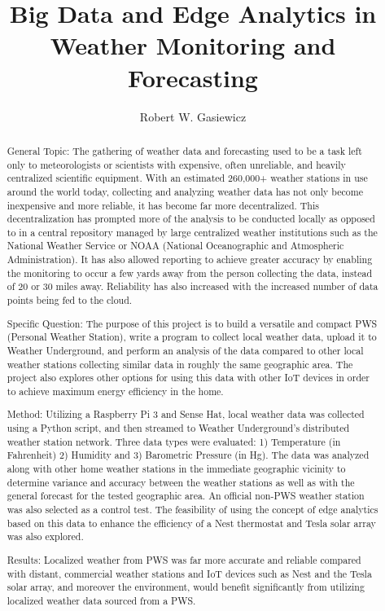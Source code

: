 \documentclass[sigconf]{acmart}
\begin{document}
\title{Big Data and Edge Analytics in Weather Monitoring and Forecasting}


\author{Robert W. Gasiewicz}

\begin{abstract}
General Topic: The gathering of weather data and forecasting used to be a task left only to meteorologists or scientists with expensive, often unreliable, and heavily centralized scientific equipment. With an estimated 260,000+ weather stations in use around the world today\cite{WundergroundOverview2017}, collecting and analyzing weather data has not only become inexpensive and more reliable, it has become far more decentralized. This decentralization has prompted more of the analysis to be conducted locally as opposed to in a central repository managed by large centralized weather institutions such as the National Weather Service or NOAA (National Oceanographic and Atmospheric Administration). It has also allowed reporting to achieve greater accuracy by enabling the monitoring to occur a few yards away from the person collecting the data, instead of 20 or 30 miles away. Reliability has also increased with the increased number of data points being fed to the cloud.

Specific Question: The purpose of this project is to build a versatile and compact PWS (Personal Weather Station), write a program to collect local weather data, upload it to Weather Underground, and perform an analysis of the data compared to other local weather stations collecting similar data in roughly the same geographic area. The project also explores other options for using this data with other IoT devices in order to achieve maximum energy efficiency in the home.

Method: Utilizing a Raspberry Pi 3 and Sense Hat, local weather data was collected using a Python script, and then streamed to Weather Underground's distributed weather station network. Three data types were evaluated: 1) Temperature (in Fahrenheit) 2) Humidity and 3) Barometric Pressure (in Hg). The data was analyzed along with other home weather stations in the immediate geographic vicinity to determine variance and accuracy between the weather stations as well as with the general forecast for the tested geographic area. An official non-PWS weather station was also selected as a control test. The feasibility of using the concept of edge analytics based on this data to enhance the efficiency of a Nest thermostat and Tesla solar array was also explored. 

Results: Localized weather from PWS was far more accurate and reliable compared with distant, commercial weather stations and IoT devices such as Nest and the Tesla solar array, and moreover the environment, would benefit significantly from utilizing localized weather data sourced from a PWS.

\end{abstract}
\end{document}
